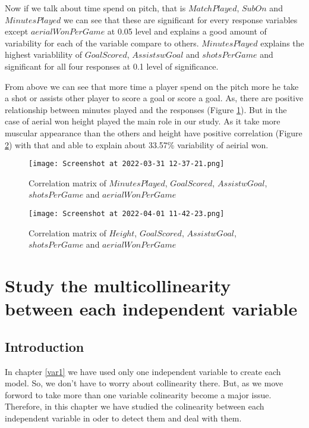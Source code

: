 \documentclass[12pt]{article}
\begin{document}
Now if we talk about time spend on pitch, that is $ MatchPlayed $, $ SubOn $ and $ MinutesPlayed $ we can see that these are significant for every response variables except $ aerialWonPerGame $ at 0.05 level and explains a good amount of variability for each of the variable compare to others. $ MinutesPlayed $ explains the highest variablility of $ GoalScored $, $ AssistswGoal $ and $ shotsPerGame $ and significant for all four responses at 0.1 level of significance. 

From above we can see that more time a player spend on the pitch more he take a shot or assists other player to score a goal or score a goal. As, there are positive relationship between minutes played and the responses (Figure \ref{MinCor}). But in the case of aerial won height played the main role in our study. As it take more muscular appearance than the others and height have positive correlation (Figure \ref{HeiCor}) with that and able to explain about 33.57\% variability of aeirial won. 

\begin{minipage}{0.4\textwidth}
	\begin{figure}[H]
		\centering
		\texttt{[image: Screenshot at 2022-03-31 12-37-21.png]}
		\caption{ Correlation matrix of $ MinutesPlayed $, $ GoalScored $, $ AssistwGoal $, $ shotsPerGame $ and $ aerialWonPerGame $ }
		\label{fig:1}
		\label{MinCor}
	\end{figure} 
\end{minipage}
  \hfill
  \begin{minipage}{0.4\textwidth}
  	\begin{figure}[H]
  		\centering
  		\texttt{[image: Screenshot at 2022-04-01 11-42-23.png]}
  		\caption{ Correlation matrix of $ Height $, $ GoalScored $, $ AssistwGoal $, $ shotsPerGame $ and $ aerialWonPerGame $ }
  		\label{fig:1}
  		\label{HeiCor}
  	\end{figure} 
  	
  \end{minipage}
\newpage

\section{Study the multicollinearity between each independent variable}
\label{MulCor}
\subsection{Introduction}
In chapter \ref{var1} we have used only one independent variable to create each model. So, we don't have to worry about collinearity there. But, as we move forword to take more than one variable colinearity become a major issue. Therefore, in this chapter we have studied the colinearity between each independent variable in oder to detect them and deal with them.
\end{document}
